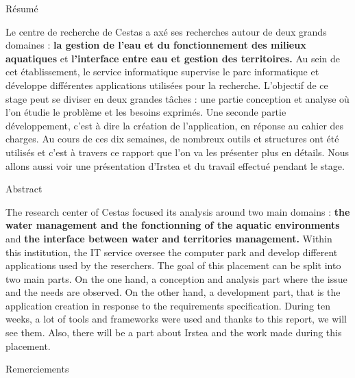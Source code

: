 \documentclass[12pt,a4paper,titlepage,twoside]{report}
\newcommand{\titre}{Développement d'une application web}
\begin{document}
\raggedbottom 

%

\fancyhead{}
\fancyhead[CO]{\leftmark\sffamily}
\fancyhead[CE]{ \sffamily\titre{}}
\fancyfoot[CO]{\sffamily\thepage}
\fancyfoot[CE]{\sffamily\thepage}
\makeatletter
\def\cleardoublepage{\clearpage\if@twoside \ifodd\c@page\else
  \hbox{}
  \vspace*{\fill}

  \vspace{\fill}
  \thispagestyle{empty}
  \newpage
  \if@twocolumn\hbox{}\newpage\fi\fi\fi}
\makeatother
\lstset{ breaklines=true}

\cleardoublepage
\LARGE{Résumé}\normalsize\newline
 	
Le centre de recherche de Cestas a axé ses recherches autour de deux grands domaines : \textbf{la gestion de l'eau et du fonctionnement des milieux aquatiques} et \textbf{l'interface entre eau et gestion des territoires.} 
Au sein de cet établissement, le service informatique supervise le parc informatique et développe différentes applications utilisées pour la recherche. 
L'objectif de ce stage peut se diviser en deux grandes tâches : une partie conception et analyse où l'on étudie le problème et les besoins exprimés. Une seconde partie développement, c'est à dire la création de l'application, en réponse au cahier des charges.
Au cours de ces dix semaines, de nombreux outils et structures ont été utilisés et c'est à travers ce rapport que l'on va les présenter plus en détails. Nous allons aussi voir une présentation d'Irstea et du travail effectué pendant le stage. \newline

\LARGE{Abstract}\normalsize\newline

The research center of Cestas focused its analysis around two main domains :  \textbf{the water management and the fonctionning of the aquatic environments} and \textbf{the interface between water and territories management.} 
Within this institution, the IT service oversee the computer park and develop different applications used by the reserchers.
The goal of this placement can be split into two main parts. On the one hand, a conception and analysis part where the issue and the needs are observed. On the other hand, a development part, that is the application creation in response to the requirements specification.
During ten weeks, a lot of tools and frameworks were used and thanks to this report, we will see them. Also, there will be a part about Irstea and the work made during this placement.
\cleardoublepage
\LARGE{Remerciements}\normalsize\newline\newline
\end{document}
